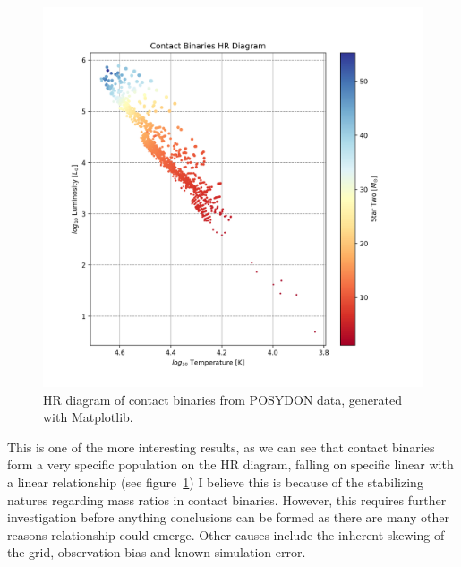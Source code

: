 \documentclass[12pt, a4paper]{article}
\begin{document}
        \begin{figure}[H]
            \centering
            \includegraphics[scale = .6]{figs/GeneratedFigs/W_UMa/ContactbinaryHRDiagram.png}
            \caption{HR diagram of contact binaries from POSYDON data, generated with Matplotlib.}
            \label{contactBinaryHRDiagram}
        \end{figure}

        This is one of the more interesting results, as we can see that contact binaries form a very specific population on the HR diagram, falling on specific linear with a linear relationship (see figure~\ref{contactBinaryHRDiagram}) I believe this is because of the stabilizing natures regarding mass ratios in contact binaries. However, this requires further investigation before anything conclusions can be formed as there are many other reasons relationship could emerge. Other causes include the inherent skewing of the grid, observation bias and known simulation error. 
        
\end{document}
